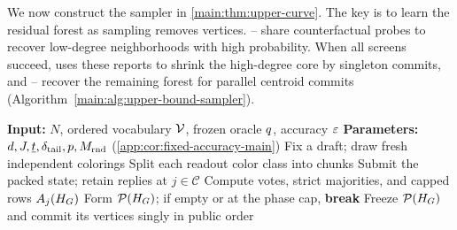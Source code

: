 {\color{red}
We now construct the sampler in \cref{main:thm:upper-curve}.
The key is to learn the residual forest as sampling removes vertices.
-- share counterfactual
probes to recover low-degree neighborhoods with high probability.
When all screens succeed,  uses these reports to
shrink the high-degree core by singleton commits, and
-- recover the
remaining forest for parallel centroid commits
(Algorithm~\ref{main:alg:upper-bound-sampler}).

\begin{algorithm}[H]
\caption{\textcolor{red}{Counterfactual-probing sampler: shared tests, claim-based peeling, and centroid commits. Full safeguards: \cref{app:alg:complete-sampler}.}}
\label{main:alg:upper-bound-sampler}
{\color{red}\small
\begin{algorithmic}[1]
\Statex \textbf{Input:} $N$, ordered vocabulary $\mathcal V$, frozen oracle $q$, accuracy $\varepsilon$
\Statex \textbf{Parameters:} $d,J,\underline t,\delta_{\mathrm{tail}},p,M_{\mathrm{rnd}}$
  (\cref{app:cor:fixed-accuracy-main})
\State {}
\Loop
  \State {} Fix a draft; draw fresh independent colorings
  \State {}
    \State {} Split each readout color class into chunks
        \State {} Submit the packed state; retain replies at $j\in\mathcal C$
      \EndFor
    \EndFor
  \EndFor
  \State {} Compute votes, strict majorities, and capped rows $A_{j}(H_{G})$
  \State {} Form $\mathcal P(H_{G})$; if empty or at the phase cap, \textbf{break}
  \State Freeze $\mathcal P(H_{G})$ and commit its vertices singly in public order
\EndLoop
\State {}\enspace {}
\end{algorithmic}
}
\end{algorithm}

}

